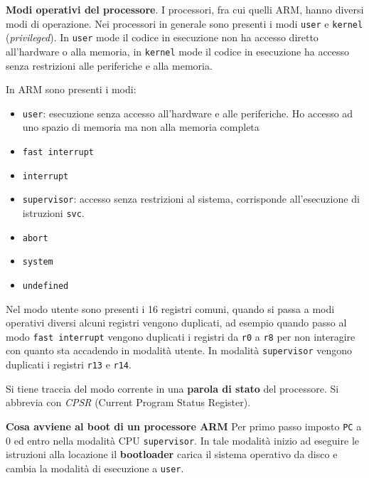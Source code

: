 \begin{defn}
    \textbf{Modi operativi del processore}.
    I processori, fra cui quelli ARM, hanno diversi modi di operazione. Nei processori in generale
    sono presenti i modi \verb|user| e \verb|kernel| (\textit{privileged}). In \verb|user| mode
    il codice in esecuzione non ha accesso diretto all'hardware o alla memoria, in \verb|kernel| mode
    il codice in esecuzione ha accesso senza restrizioni alle periferiche e alla memoria.

    In ARM sono presenti i modi:
    \begin{itemize}
        \item \verb|user|: esecuzione senza accesso all'hardware e alle periferiche.
        Ho accesso ad uno spazio di memoria ma non alla memoria completa
        \item \verb|fast interrupt|
        \item \verb|interrupt|
        \item \verb|supervisor|: accesso senza restrizioni al sistema, corrisponde all'esecuzione
        di istruzioni \verb|svc|.
        \item \verb|abort|
        \item \verb|system|
        \item \verb|undefined|
    \end{itemize}

    Nel modo utente sono presenti i 16 registri comuni, quando si passa a modi operativi diversi
    alcuni registri vengono duplicati, ad esempio quando passo al modo \verb|fast interrupt| vengono duplicati
    i registri da \verb|r0| a \verb|r8| per non interagire con quanto sta accadendo in modalità utente.
    In modalità \verb|supervisor| vengono duplicati i registri \verb|r13| e \verb|r14|.

    Si tiene traccia del modo corrente in una \textbf{parola di stato} del processore.
    Si abbrevia con \textit{CPSR} (Current Program Status Register).

\end{defn}


\begin{defn}
    \textbf{Cosa avviene al boot di un processore ARM}
    Per primo passo imposto \verb|PC| a 0 ed entro nella modalità CPU \verb|supervisor|.
    In tale modalità inizio ad eseguire le istruzioni alla locazione il \textbf{bootloader} carica il
    sistema operativo da disco e cambia la modalità di esecuzione a \verb|user|.
\end{defn}